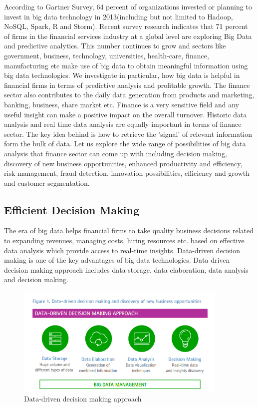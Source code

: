 \documentclass[sigconf]{acmart}
\begin{document}
According to Gartner Survey, 64 percent of organizations invested or planning to invest in big data technology in 2013(including but not limited to Hadoop, NoSQL, Spark, R and Storm)\cite{gartner-survey}. Recent survey research indicates that 71 percent of firms in the financial services
industry at a global level are exploring Big
Data and predictive analytics\cite{accenture-next-generation-financial}. This number continues to grow and sectors like government, business, technology, universities, health-care, finance, manufacturing etc make use of big data to obtain meaningful information using big data technologies\cite{wiki-bigdata}. We investigate in particular, how big data is helpful in financial firms in terms of predictive analysis and profitable growth. The finance sector also contributes to the daily data generation from products and marketing, banking, business, share market etc. Finance is a very sensitive field and any useful insight can make a positive impact on the overall turnover. Historic data analysis and real time data analysis are equally important in terms of finance sector. The key idea behind is how to retrieve the 'signal' of relevant information form the bulk of data. Let us explore the wide range of possibilities of big data analysis that finance sector can come up with including decision making, discovery of new business opportunities, enhanced productivity and efficiency, risk management, fraud detection, innovation possibilities, efficiency and growth and customer segmentation.

\subsection{Efficient Decision Making}

The era of big data helps financial firms to take quality business decisions related to expanding revenues, managing costs, hiring resources etc. based on effective data analysis which provide access to real-time insights.  Data-driven decision making is one of the key advantages of big data technologies. Data driven decision making approach includes data storage, data elaboration, data analysis and decision making\cite{accenture-next-generation-financial}.

\begin{figure}
  \centering
  \includegraphics[width=0.9\textwidth]{images/Figure1.png}
  \caption{Data-driven decision making approach 
  \cite{accenture-next-generation-financial}}
  \label{fig:Figure1} 
\end{figure}
\end{document}

